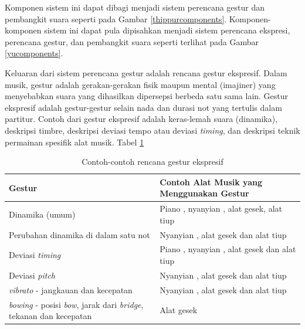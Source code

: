 Komponen sistem ini dapat dibagi menjadi sistem perencana gestur dan pembangkit suara \parencite{Thippur2013ProbabilisticMO} seperti pada Gambar \ref{thippurcomponents}. Komponen-komponen sistem ini dapat pula dipisahkan menjadi sistem perencana ekspresi, perencana gestur, dan pembangkit suara \parencite{yu2017bowing} seperti terlihat pada Gambar \ref{yucomponents}.

Keluaran dari sistem perencana gestur adalah rencana gestur ekspresif. Dalam musik, gestur adalah gerakan-gerakan fisik maupun mental (imajiner) yang menyebabkan suara yang dihasilkan dipersepsi berbeda satu sama lain. Gestur ekspresif adalah gestur-gestur selain nada dan durasi not yang tertulis dalam partitur. Contoh dari gestur ekspresif adalah keras-lemah suara (dinamika), deskripsi timbre, deskripsi deviasi tempo atau deviasi \textit{timing}, dan deskripsi teknik permainan spesifik alat musik. Tabel \ref{tab-expressive-gesture-plan}

\begin{table}[h]
    \centering
    \caption{Contoh-contoh rencana gestur ekspresif}\label{tab-expressive-gesture-plan}
    \begin{tabular}{ |p{}|p{}| } 
     \hline
     \textbf{Gestur} & \textbf{Contoh Alat Musik yang Menggunakan Gestur} \\
     \hline 
     Dinamika (umum) & Piano \parencite{Kirke:2009:SCS:1592451.1592454}, nyanyian \parencite{bonada2017singing}, alat gesek, alat tiup\parencite{wagerstringwoodwind}  \\ %
     \hline
     Perubahan dinamika di dalam satu not & Nyanyian \parencite{bonada2017singing}, alat gesek dan alat tiup\parencite{wagerstringwoodwind}\\
     \hline
     Deviasi \textit{timing} & Piano \parencite{Kirke:2009:SCS:1592451.1592454}, nyanyian \parencite{bonada2017singing}, alat gesek dan alat tiup\parencite{wagerstringwoodwind}\\
     \hline
     Deviasi \textit{pitch} &  Nyanyian \parencite{bonada2017singing}, alat gesek dan alat tiup\parencite{wagerstringwoodwind}\\ 
     \hline
     \textit{vibrato} - jangkauan dan kecepatan & Nyanyian \parencite{bonada2017singing}, alat gesek dan alat tiup\parencite{wagerstringwoodwind}\\
     \hline
     \textit{bowing} - posisi \textit{bow}, jarak dari \textit{bridge}, tekanan dan kecepatan & Alat gesek \parencite{Thippur2013ProbabilisticMO}\\
     \hline
    \end{tabular}
\end{table}

